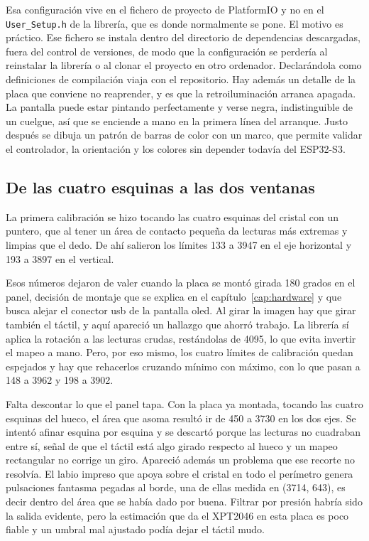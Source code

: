 Esa configuración vive en el fichero de proyecto de PlatformIO y no en el
\texttt{User\_Setup.h} de la librería, que es donde normalmente se pone. El
motivo es práctico. Ese fichero se instala dentro del directorio de dependencias
descargadas, fuera del control de versiones, de modo que la configuración se
perdería al reinstalar la librería o al clonar el proyecto en otro ordenador.
Declarándola como definiciones de compilación viaja con el repositorio. Hay
además un detalle de la placa que conviene no reaprender, y es que la
retroiluminación arranca apagada. La pantalla puede estar pintando
perfectamente y verse negra, indistinguible de un cuelgue, así que se enciende a
mano en la primera línea del arranque. Justo después se dibuja un patrón de
barras de color con un marco, que permite validar el controlador, la orientación
y los colores sin depender todavía del ESP32-S3.

\subsection{De las cuatro esquinas a las dos ventanas}

La primera calibración se hizo tocando las cuatro esquinas del cristal con un
puntero, que al tener un área de contacto pequeña da lecturas más extremas y
limpias que el dedo. De ahí salieron los límites 133 a 3947 en el eje horizontal
y 193 a 3897 en el vertical.

Esos números dejaron de valer cuando la placa se montó girada 180 grados en el
panel, decisión de montaje que se explica en el capítulo~\ref{cap:hardware} y que
busca alejar el conector \gls{usb} de la pantalla \gls{oled}. Al girar la imagen
hay que girar también el táctil, y aquí apareció un hallazgo que ahorró trabajo.
La librería sí aplica la rotación a las lecturas crudas, restándolas de 4095, lo
que evita invertir el mapeo a mano. Pero, por eso mismo, los cuatro límites de
calibración quedan espejados y hay que rehacerlos cruzando mínimo con máximo,
con lo que pasan a 148 a 3962 y 198 a 3902.

Falta descontar lo que el panel tapa. Con la placa ya montada, tocando las cuatro 
esquinas del hueco, el área que asoma resultó ir de 450 a 3730 en los dos ejes. 
Se intentó afinar esquina por esquina y se descartó porque las lecturas no cuadraban 
entre sí, señal de que el táctil está algo girado respecto al hueco y un mapeo 
rectangular no corrige un giro. Apareció además un problema que ese recorte no 
resolvía. El labio impreso que apoya sobre el cristal en todo el perímetro genera 
pulsaciones fantasma pegadas al borde, una de ellas medida en (3714, 643), es decir 
dentro del área que se había dado por buena. Filtrar por presión habría sido la salida 
evidente, pero la estimación que da el XPT2046 en esta placa es poco fiable y un umbral 
mal ajustado podía dejar el táctil mudo.

